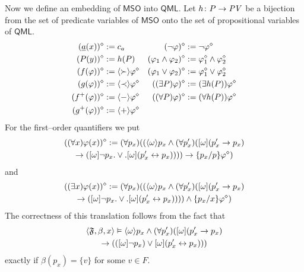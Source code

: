 Now we define an embedding of $\mathsf{MSO}$ into $\mathsf{QML}$.
Let $h \colon P \rightarrow \mbox{\it PV\/}$ be a bijection from the
set of predicate variables of $\mathsf{MSO}$ onto the set of 
propositional variables of $\mathsf{QML}$.
\begin{equation}
\begin{split}
(\underline{a}(x))^{\diamond} & := c_a &
(\neg \varphi)^{\diamond} & := \neg \varphi^{\diamond} \\
(P(y))^{\diamond} & := h(P) &
(\varphi_1 \wedge \varphi_2)^{\diamond} &
   :=  \varphi_1^{\diamond} \wedge \varphi_2^{\diamond} \\
(f(\varphi))^{\diamond} & := \langle\succ\rangle \varphi^{\diamond} &
(\varphi_1 \vee \varphi_2)^{\diamond} &
   :=  \varphi_1^{\diamond} \vee \varphi_2^{\diamond} \\
(g(\varphi))^{\diamond} & := \langle\prec\rangle \varphi^{\diamond} &
((\exists P)\varphi)^{\diamond} & := (\exists h(P))\varphi^{\diamond} \\
(f^+(\varphi))^{\diamond} & := \langle-\rangle \varphi^{\diamond} &
((\forall P)\varphi)^{\diamond} & := (\forall h(P))\varphi^{\diamond} \\
(g^+(\varphi))^{\diamond} & := \langle+\rangle \varphi^{\diamond} & & 
\end{split}
\end{equation}
For the first--order quantifiers we put
\begin{multline}
((\forall x)\varphi(x))^{\diamond} := 
(\forall p_x)((\langle \omega\rangle p_x \wedge
        (\forall p'_x)([\omega](p'_x \rightarrow p_x) \\
	\rightarrow ([\omega]\neg p_x. \vee. [\omega](p'_x \leftrightarrow p_x)))) 
	    \rightarrow \{p_x/p\}\varphi^{\diamond}) 
\end{multline}
and 
\begin{multline}
((\exists x)\varphi(x))^{\diamond} :=  
(\forall p_x)((\langle \omega\rangle p_x \wedge 
	(\forall p'_x)([\omega](p'_x \rightarrow p_x) \\
	\rightarrow ([\omega]\neg p_x.  \vee .[\omega](p'_x \leftrightarrow p_x)))) 
	    \wedge \{p_x/x\}\varphi^{\diamond})
\end{multline}
The correctness of this translation follows from the fact that
\begin{multline}
\langle \mathfrak{F}, \beta, x\rangle \vDash 
\langle \omega\rangle p_x \wedge (\forall p'_x)([\omega](p'_x \rightarrow p_x) \\
\rightarrow (([\omega]\neg p_x) \vee [\omega](p'_x \leftrightarrow p_x)))
\end{multline}
exactly if $\beta(p_x) = \{v\}$ for some $v \in F$.
